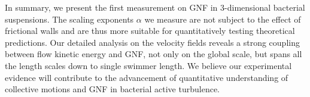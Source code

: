 \documentclass[twocolumn,aps,prl,amsmath,amssymb,longbibliography]{revtex4-2}
\begin{document}
In summary, we present the first measurement on GNF in 3-dimensional bacterial suspensions. The scaling exponents $\alpha$ we measure are not subject to the effect of frictional walls and are thus more suitable for quantitatively testing theoretical predictions.
Our detailed analysis on the velocity fields reveals a strong coupling between flow kinetic energy and GNF, not only on the global scale, but spans all the length scales down to single swimmer length.
We believe our experimental evidence will contribute to the advancement of quantitative understanding of collective motions and GNF in bacterial active turbulence.





\end{document}
